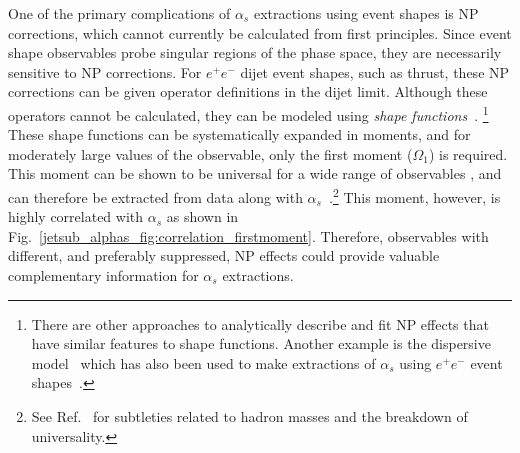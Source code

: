 \documentclass[11pt]{cernrep}
\begin{document}
One of the primary complications of $\alpha_s$ extractions using event shapes is NP corrections, which cannot currently be calculated from first principles.
%
Since event shape observables probe singular regions of the phase space, they are necessarily sensitive to NP corrections.  
%
For $e^+e^-$ dijet event shapes, such as thrust, these NP corrections can be given operator definitions in the dijet limit.
%
Although these operators cannot be calculated, they can be modeled using \textit{shape functions}~\cite{Korchemsky:1999kt,Korchemsky:2000kp,Hoang:2007vb,Ligeti:2008ac}.%
\footnote{There are other approaches to analytically describe and fit NP effects that have similar features to shape functions.  Another example is the dispersive model~\cite{Dokshitzer:1995qm,Dokshitzer:1995zt} which has also been used to make extractions of $\alpha_s$ using $e^+e^-$ event shapes~\cite{Gehrmann:2012sc}.}
%
These shape functions can be systematically expanded in moments, and for moderately large values of the observable, only the first moment ($\Omega_1$) is required.
%
This moment can be shown to be universal for a wide range of observables \cite{Lee:2006fn,Lee:2007jr}, and can therefore be extracted from data along with $\alpha_s$~\cite{Abbate:2010xh,Abbate:2012jh,Hoang:2015hka}.\footnote{See Ref.~\cite{Salam:2001bd,Mateu:2012nk} for subtleties related to hadron masses and the breakdown of universality.}
%
This moment, however, is highly correlated with $\alpha_s$ as shown in Fig.~\ref{jetsub_alphas_fig:correlation_firstmoment}.
%
Therefore, observables with different, and preferably suppressed, NP effects could provide valuable complementary information for $\alpha_s$ extractions.
%

  
\end{document}
